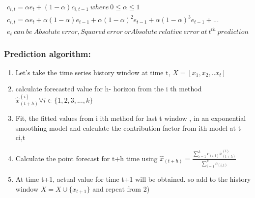 \begin{multline}
c_{i,t}= \alpha e_t + (1-\alpha)c_{i,t-1} \ where \ 0\leq \alpha \leq 1	\\ 
c_{i,t}=\alpha e_t + \alpha(1-\alpha)e_{t-1}+\alpha(1-\alpha)^2e_{t-1}+\alpha(1-\alpha)^3e_{t-1}+ . .. \  \\
 e_{t} \ can \ be \ Absolute \ error , Squared \ error \ or Absolute \ relative \ error \ at \ t^{th} \ prediction 
\end{multline}

\subsubsection{Prediction algorithm:}

\begin{enumerate}
\item  Let's take the  time series history window at time t, $X=[x_{1},x_{2},.. x_{t}]$
\item calculate forecasted value for  h- horizon from the i th method $\hat{x}_{(t+h)}^{(i)} \forall i \in \{1,2,3,...,k\}$
\item Fit, the fitted values from i ith method for last t window ,  in an exponential smoothing model and calculate the contribution factor from ith model at t ci,t
\item Calculate the point forecast for t+h time using 
$\hat{x}_{(t+h)}= \frac{\sum_{i=1}^{k}c_{(i,t)} \hat{x}_{(t+h)}^{(i)}}{\sum_{i=1}^{k}c_{(i,t)}}$
\item At time t+1,  actual value for time t+1  will be obtained. so add  to the history window $X=X\cup \{x_{t+1}\}$ and repeat from 2)
\end{enumerate}
